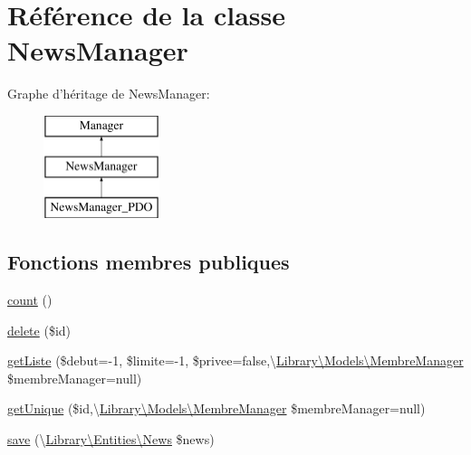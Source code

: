 \hypertarget{class_library_1_1_models_1_1_news_manager}{\section{Référence de la classe News\+Manager}
\label{class_library_1_1_models_1_1_news_manager}
}
Graphe d'héritage de News\+Manager\+:\begin{figure}[H]
\begin{center}
\leavevmode
\includegraphics[height=3.000000cm]{class_library_1_1_models_1_1_news_manager}
\end{center}
\end{figure}
\subsection*{Fonctions membres publiques}
\begin{DoxyCompactItemize}
\item 
\hyperlink{class_library_1_1_models_1_1_news_manager_ac751e87b3d4c4bf2feb03bee8b092755}{count} ()
\item 
\hyperlink{class_library_1_1_models_1_1_news_manager_a2f8258add505482d7f00ea26493a5723}{delete} (\$id)
\item 
\hyperlink{class_library_1_1_models_1_1_news_manager_a18850922c903866df8e910553877bd04}{get\+Liste} (\$debut=-\/1, \$limite=-\/1, \$privee=false,\textbackslash{}\hyperlink{class_library_1_1_models_1_1_membre_manager}{Library\textbackslash{}\+Models\textbackslash{}\+Membre\+Manager} \$membre\+Manager=null)
\item 
\hyperlink{class_library_1_1_models_1_1_news_manager_a6813dfac681bc517ce0a9608f48367f3}{get\+Unique} (\$id,\textbackslash{}\hyperlink{class_library_1_1_models_1_1_membre_manager}{Library\textbackslash{}\+Models\textbackslash{}\+Membre\+Manager} \$membre\+Manager=null)
\item 
\hyperlink{class_library_1_1_models_1_1_news_manager_a9a191376ae7a1c6d3af8d977fe50e621}{save} (\textbackslash{}\hyperlink{class_library_1_1_entities_1_1_news}{Library\textbackslash{}\+Entities\textbackslash{}\+News} \$news)
\end{DoxyCompactItemize}
